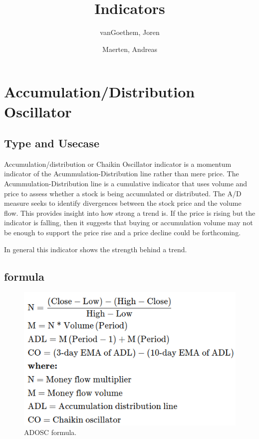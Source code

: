 \documentclass[12pt,a4paper]{article}
\begin{document}
\begin{titlepage}
    \author{
        vanGoethem, Joren
        \and
        Maerten, Andreas
    }
    \title{Indicators}
\end{titlepage}

\maketitle
\newpage
\tableofcontents
\newpage


\section{Accumulation/Distribution Oscillator}

\subsection{Type and Usecase}
Accumulation/distribution or Chaikin Oscillator indicator is a momentum indicator of the Acummulation-Distribution line rather than mere price. The Acummulation-Distribution line is a cumulative indicator that uses volume and price to assess whether a stock is being accumulated or distributed. The A/D measure seeks to identify divergences between the stock price and the volume flow. This provides insight into how strong a trend is. If the price is rising but the indicator is falling, then it suggests that buying or accumulation volume may not be enough to support the price rise and a price decline could be forthcoming.

In general this indicator shows the strength behind a trend.

\subsection{formula}

\begin{figure}[H]
    \includegraphics[scale=0.7]{../images/ADOSC.png}
    \caption{ADOSC formula.}
    \label{fig:ADOSC}
\end{figure}
\end{document}

